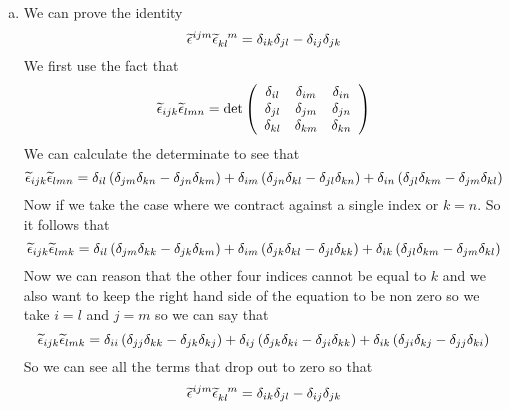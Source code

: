 \documentclass[11pt]{article}
\numberwithin{equation}{section}
\begin{document}
\begin{enumerate}[(a)]
\item
We can prove the identity 
$$\widetilde{\epsilon}^{ijm}\widetilde{\epsilon}_{kl}^{\ \ m} = \delta_{ik}\delta_{jl} - \delta_{ij}\delta_{jk}$$
We first use the fact that
$$\widetilde{\epsilon}_{ijk}\widetilde{\epsilon}_{lmn} = \det\left(\begin{array}{ccc}
		\delta_{il}	&\delta_{im}	&\delta_{in}\\
		\delta_{jl}	&\delta_{jm}	&\delta_{jn}\\
		\delta_{kl}	&\delta_{km}	&\delta_{kn}\\
			\end{array}\right)$$
We can calculate the determinate to see that
$$\widetilde{\epsilon}_{ijk}\widetilde{\epsilon}_{lmn} = \delta_{il}\left(\delta_{jm}\delta_{kn} - \delta_{jn}\delta_{km}\right) + \delta_{im}\left(\delta_{jn}\delta_{kl} - \delta_{jl}\delta_{kn}\right) +\delta_{in}\left(\delta_{jl}\delta_{km} - \delta_{jm}\delta_{kl}\right)$$
Now if we take the case where we contract against a single index or $k=n$. So it follows that
$$\widetilde{\epsilon}_{ijk}\widetilde{\epsilon}_{lmk} = \delta_{il}\left(\delta_{jm}\delta_{kk} - \delta_{jk}\delta_{km}\right) + \delta_{im}\left(\delta_{jk}\delta_{kl} - \delta_{jl}\delta_{kk}\right) +\delta_{ik}\left(\delta_{jl}\delta_{km} - \delta_{jm}\delta_{kl}\right)$$
Now we can reason that the other four indices cannot be equal to $k$ and we also want to keep the right hand side of the equation to be non zero so we take $i=l$ and $j=m$ so we can say that
$$\widetilde{\epsilon}_{ijk}\widetilde{\epsilon}_{lmk} = \delta_{ii}\left(\delta_{jj}\delta_{kk} - \delta_{jk}\delta_{kj}\right) + \delta_{ij}\left(\delta_{jk}\delta_{ki} - \delta_{ji}\delta_{kk}\right) +\delta_{ik}\left(\delta_{ji}\delta_{kj} - \delta_{jj}\delta_{ki}\right)$$
So we can see all the terms that drop out to zero so that
$$\widetilde{\epsilon}^{ijm}\widetilde{\epsilon}_{kl}^{\ \ m} = \delta_{ik}\delta_{jl} - \delta_{ij}\delta_{jk}$$



\end{enumerate}
\end{document}
